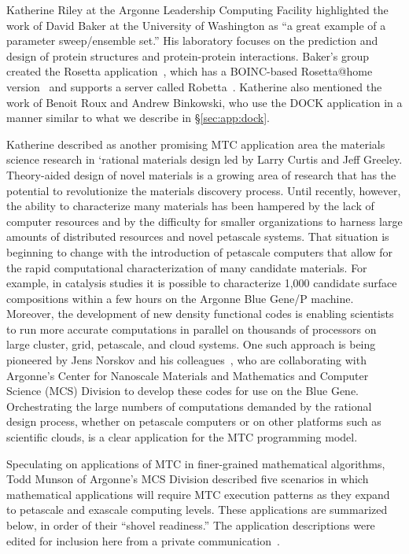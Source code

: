 \documentclass[10pt,letterpaper]{article}
\begin{document}
Katherine Riley at the Argonne Leadership Computing Facility highlighted the work of David Baker
at the University of Washington as ``a great example of a parameter sweep/ensemble set.''  His
laboratory focuses on the prediction and design of protein structures
and protein-protein interactions.  Baker's group created the Rosetta application~\cite{rosetta},
which has a BOINC-based Rosetta@home version~\cite{rosetta@home} and supports a server
called Robetta~\cite{robetta}.  Katherine also mentioned the work of Benoit Roux and Andrew Binkowski, who use the DOCK application in a manner similar to what we describe in \S\ref{sec:app:dock}.

Katherine described as another promising MTC application area the materials science research in `rational materials design led by Larry Curtis and Jeff Greeley.
Theory-aided design of novel materials is a growing area of research that has the potential to revolutionize the materials discovery process. Until recently, however, the ability to characterize many materials has been hampered by the lack of computer resources and by the difficulty for smaller organizations to harness large amounts of distributed resources and novel petascale systems. 
That situation is beginning to change with the introduction of petascale computers that allow for the rapid computational characterization of many candidate materials. For example, in catalysis studies it is possible to characterize 1,000 candidate surface compositions within a few hours on the Argonne Blue Gene/P machine. Moreover, the development of new density functional codes is enabling scientists to run more accurate computations in parallel on thousands of processors on large cluster, grid, petascale, and cloud systems. One such approach is being pioneered by Jens Norskov and his colleagues~\cite{Greeley2006,Greeley2009}, who are collaborating with Argonne's Center for Nanoscale Materials and Mathematics and Computer Science (MCS) Division to develop these codes for use on the Blue Gene.
Orchestrating the large numbers of computations demanded by the rational design process, whether on petascale computers or on other platforms such as scientific clouds, is a clear application for the MTC programming model.

Speculating on applications of MTC in finer-grained mathematical algorithms, Todd Munson of Argonne's MCS Division described five scenarios in which mathematical applications will require MTC execution patterns as they expand to petascale and exascale computing levels. These applications are summarized below, in order
of their ``shovel readiness.'' The application descriptions were edited for inclusion here from a private communication~\cite{Munson2010}.
\end{document}
